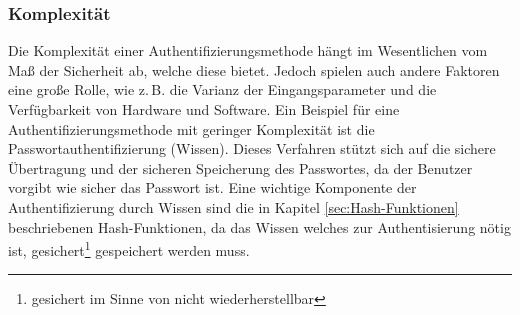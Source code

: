 \documentclass[11pt,a4paper,ngerman]{scrreprt}
\begin{document}
\subsubsection{Komplexität}
Die Komplexität einer Authentifizierungsmethode hängt im Wesentlichen vom Maß der Sicherheit ab, welche diese bietet. Jedoch spielen auch andere Faktoren eine große Rolle, wie z.\,B. die Varianz der Eingangsparameter und die Verfügbarkeit von Hardware und Software. Ein Beispiel für eine Authentifizierungsmethode mit geringer Komplexität ist die Passwortauthentifizierung (Wissen). Dieses Verfahren stützt sich auf die sichere Übertragung und der sicheren Speicherung des Passwortes, da der Benutzer vorgibt wie sicher das Passwort ist. Eine wichtige Komponente der Authentifizierung durch Wissen sind die in Kapitel \ref{sec:Hash-Funktionen} beschriebenen Hash-Funktionen, da das Wissen welches zur Authentisierung nötig ist, gesichert\footnote{gesichert im Sinne von nicht wiederherstellbar} gespeichert werden muss.
\end{document}
